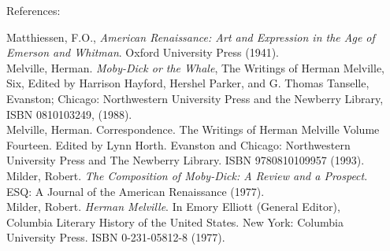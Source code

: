 \documentclass[final]{beamer}
\begin{document}
\begin{frame}{}
\begin{columns}
\begin{column}{.49\textwidth}
\begin{block}
\end{block}
\end{column}


\begin{column}{.49\textwidth}
\begin{block}
{\large References:}
{\tiny
\begin{thebibliography}{99}

Matthiessen, F.O., 
{\em American Renaissance: Art and Expression in the Age of Emerson and Whitman}. 
Oxford University Press (1941).
\\

Melville, Herman. 
{\em Moby-Dick or the Whale}, 
The Writings of Herman Melville, Six, Edited by Harrison Hayford, Hershel Parker, and G. Thomas Tanselle, Evanston; Chicago: Northwestern University Press and the Newberry Library, 
ISBN 0810103249,  (1988).
\\

Melville, Herman. 
Correspondence. The Writings of Herman Melville Volume Fourteen. Edited by Lynn Horth. Evanston and Chicago: Northwestern University Press and The Newberry Library. ISBN 9780810109957 (1993).
\\

Milder, Robert. 
{\em The Composition of Moby-Dick: A Review and a Prospect}.
ESQ: A Journal of the American Renaissance (1977).
\\

Milder, Robert.
{\em Herman Melville}.
In Emory Elliott (General Editor), 
Columbia Literary History of the United States. New York: Columbia University Press. ISBN 0-231-05812-8 (1977).


\end{thebibliography}}

\end{block}
\end{column}

\end{columns}

\end{frame}
\end{document}
